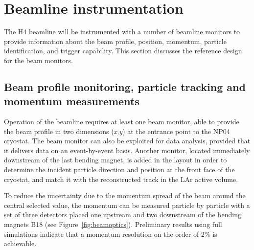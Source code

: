 \section{Beamline instrumentation}
\label{sec:beaminstruments}

The H4 beamline will be instrumented with a number of beamline monitors to provide information 
 about the beam profile, position, momentum, particle identification, and trigger capability. 
This section discusses the reference design for the beam monitors. 

\subsection{Beam profile monitoring, particle tracking and momentum measurements}

Operation of the beamline requires at least one beam monitor, able to provide the beam profile in two dimensions ({\it x,y}) at the entrance point to the NP04 cryostat.   The beam monitor can also be exploited for data analysis, provided that it delivers data on an event-by-event basis. Another monitor, located immediately downstream of the last bending magnet, is added in the layout  in order to determine the incident particle  direction and position at the front face of the cryostat, and match it with the reconstructed track in the LAr active volume.

To reduce the uncertainty due to the momentum spread of the beam around the central selected value, the momentum can be measured particle by particle
with a set of three detectors placed one upstream and two downstream of the bending magnets B18 (see Figure~\ref{fig:beamoptics}).  
Preliminary results using full simulations indicate that a momentum resolution on the order of  2\% is achievable. 
%
